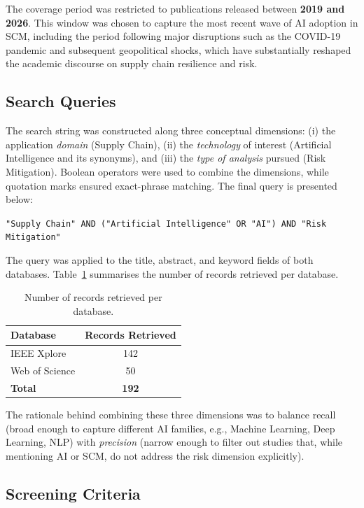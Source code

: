 The coverage period was restricted to publications released between \textbf{2019 and 2026}. This window was chosen to capture the most recent wave of AI adoption in SCM, including the period following major disruptions such as the COVID-19 pandemic and subsequent geopolitical shocks, which have substantially reshaped the academic discourse on supply chain resilience and risk.

\subsection{Search Queries}
\label{subsec:queries}

The search string was constructed along three conceptual dimensions: (i) the application \textit{domain} (Supply Chain), (ii) the \textit{technology} of interest (Artificial Intelligence and its synonyms), and (iii) the \textit{type of analysis} pursued (Risk Mitigation). Boolean operators were used to combine the dimensions, while quotation marks ensured exact-phrase matching. The final query is presented below:

\begin{center}
\texttt{"Supply Chain" AND ("Artificial Intelligence" OR "AI") AND "Risk Mitigation"}
\end{center}

The query was applied to the title, abstract, and keyword fields of both databases. Table~\ref{tab:queries} summarises the number of records retrieved per database.

\begin{table}
\centering
\caption{Number of records retrieved per database.}\label{tab:queries}
\begin{tabular}{|l|c|}
\hline
\textbf{Database} & \textbf{Records Retrieved}\\
\hline
IEEE Xplore & 142\\
Web of Science & 50\\
\hline
\textbf{Total} & \textbf{192}\\
\hline
\end{tabular}
\end{table}

The rationale behind combining these three dimensions was to balance recall (broad enough to capture different AI families, e.g., Machine Learning, Deep Learning, NLP) with \textit{precision} (narrow enough to filter out studies that, while mentioning AI or SCM, do not address the risk dimension explicitly).

\subsection{Screening Criteria}
\label{subsec:screening-criteria}

